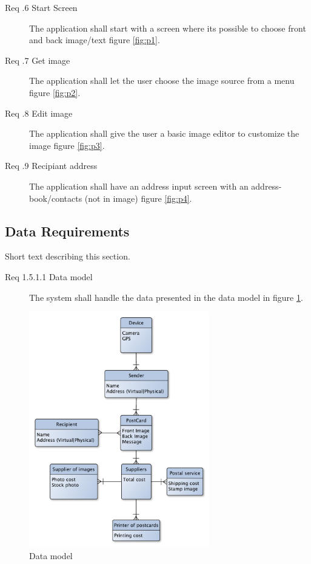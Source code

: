 \documentclass[10pt,a4paper]{article}
\newcommand{\tsss}{\thesubsubsection}
\begin{document}
\begin {description}
\item[Req \tsss.6 Start Screen] The application shall start with a screen where its possible to choose front and back image/text figure \ref{fig:p1}.
\item[Req \tsss.7 Get image] The application shall let the user choose the image source from a menu figure \ref{fig:p2}.
\item[Req \tsss.8 Edit image]The application shall give the user a basic image editor to customize the image figure \ref{fig:p3}.
\item[Req \tsss.9 Recipiant address] The application shall have an address input screen with an address-book/contacts (not in image) figure \ref{fig:p4}.
\end{description}

\subsection{Data Requirements}
Short text describing this section.

\begin {description}
\item[Req 1.5.1.1 Data model] The system shall handle the data presented in the data model in figure \ref{fig:datamodel}.
\end{description}

\begin{figure}[h!]
\centering
\includegraphics[width=0.7\textwidth]{Data_figures/DataModel.pdf}
\caption{Data model}
\label{fig:datamodel}
\end{figure}
\end{document}
